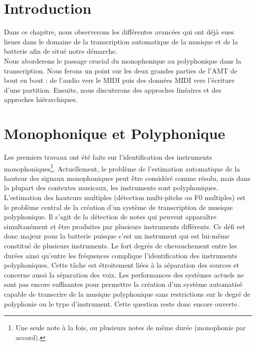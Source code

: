 \section*{Introduction}
Dans ce chapitre, nous observerons les différentes avancées qui ont déjà eues lieues dans le domaine de la transcription automatique de la musique et de la batterie afin de situé notre démarche.\\
Nous aborderons le passage crucial du monophonique au polyphonique dans la transcription. Nous ferons un point sur les deux grandes parties de l’AMT de bout en bout : de l’audio vers le MIDI puis des données MIDI vers l’écriture d’une partition. Ensuite, nous discuterons des approches linéaires et des approches hiérarchiques.
\section{Monophonique et Polyphonique}
Les premiers travaux ont été faits sur l’identification des instruments monophoniques\footnote{Une seule note à la fois, ou plusieurs notes de même durée (monophonie par accord).}\cite{future_directions}. Actuellement, le problème de l'estimation automatique de la hauteur des signaux monophoniques peut être considéré comme résolu, mais dans la plupart des contextes musicaux, les instruments sont polyphoniques. L'estimation des hauteurs multiples (détection multi-pitchs ou F0 multiples) est le problème central de la création d'un système de transcription de musique polyphonique. Il s’agit de la détection de notes qui peuvent apparaître simultanément et être produites par plusieurs instruments différents. Ce défi est donc majeur pour la batterie puisque c’est un instrument qui est lui-même constitué de plusieurs instruments. Le fort degrés de chevauchement entre les durées ainsi qu’entre les fréquences complique l’identification des instruments polyphoniques. Cette tâche est étroitement liées à la séparation des sources et concerne aussi la séparation des voix. Les performances des systèmes actuels ne sont pas encore suffisantes pour permettre la création d'un système automatisé capable de transcrire de la musique polyphonique sans restrictions sur le degré de polyphonie ou le type d'instrument. Cette question reste donc encore ouverte. 
